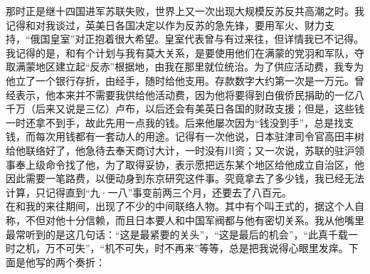 那时正是继十四国进军苏联失败，世界上又一次出现大规模反苏反共高潮之时。我记得和对我谈过，英美日各国决定以作为反苏的急先锋，要用军火、财力支持，“俄国皇室”对正抱着很大希望。皇室代表曾与有过来往，但详情我已不记得。我记得的是，和有个计划与我有莫大关系，是要使用他们在满蒙的党羽和军队，夺取满蒙地区建立起“反赤”根据地，由我在那里就位统治。为了供应活动费，我专为他立了一个银行存折，由经手，随时给他支用。存款数字大约第一次是一万元。曾经表示，他本来并不需要我供给他活动费，因为他将要得到白俄侨民捐助的一亿八千万（后来又说是三亿）卢布，以后还会有美英日各国的财政支援；但是，这些钱一时还拿不到手，故此先用一点我的钱。后来他屡次因为“钱没到手”，总是找支钱，而每次用钱都有一套动人的用途。记得有一次他说，日本驻津司令官高田丰树给他联络好了，他急待去奉天商讨大计，一时没有川资；又一次说，苏联的驻沪领事奉上级命令找了他，为了取得妥协，表示愿把远东某个地区给他成立自治区，他因此需要一笔路费，以便动身到东京研究这件事。究竟拿去了多少钱，我已经无法计算，只记得直到“九·一八”事变前两三个月，还要去了八百元。\\

在和我的来往期间，出现了不少的中间联络人物。其中有个叫王式的，据这个人自称，不但对他十分信赖，而且日本要人和中国军阀都与他有密切关系。我从他嘴里最常听到的是这几句话：“这是最紧要的关头”，“这是最后的机会”，“此真千载一时之机，万不可失”，“机不可失，时不再来”等等，总是把我说得心眼里发痒。下面是他写的两个奏折：\\

